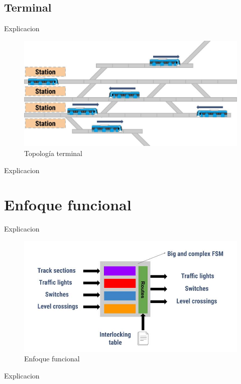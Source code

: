 	\subsection{Terminal}
		
		Explicacion
		
			\begin{figure}[h]
			\centering
				\includegraphics[scale=.4]{./Figures/Terminal}
				\caption{Topología terminal}
				\label{fig:Terminal}
			\end{figure}
		
		Explicacion
							
\section{Enfoque funcional}

	Explicacion
	
		\begin{figure}[h]
		\centering
			\includegraphics[scale=.55]{./Figures/Funcional}
			\caption{Enfoque funcional}
			\label{fig:Funcional}
		\end{figure}
	
	Explicacion
			
